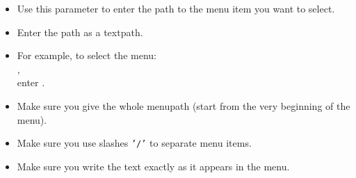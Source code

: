 \begin{itemize}
\item Use this parameter to enter the path to the menu item you want to select.
\item Enter the path as a textpath.
\item For example, to select the menu:\\ ,\\ enter .
\item Make sure you give the whole menupath (start from the very beginning of the menu).
\item Make sure you use slashes {\tt '/'} to separate menu items.
\item Make sure you write the text exactly as it appears in the menu.
 
\end{itemize}